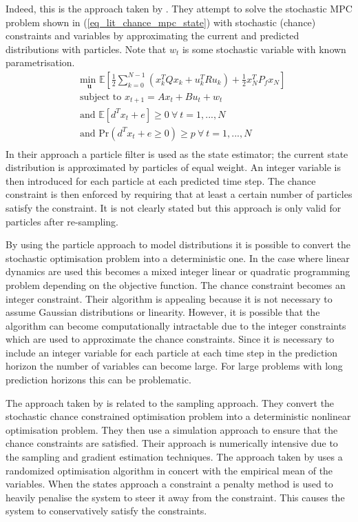Indeed, this is the approach taken by \cite{blackmore}. They attempt to solve the stochastic MPC problem shown in (\ref{eq_lit_chance_mpc_state}) with stochastic (chance) constraints and variables by approximating the current and predicted distributions with particles. Note that $w_t$ is some stochastic variable with known parametrisation.
\begin{equation}
\begin{aligned}
&\underset{\mathbf{u}}{\text{min }} \mathbb{E}\left[ \frac{1}{2}\sum_{k=0}^{N-1} \left( x_k^TQx_k + u_k^TRu_k \right) + \frac{1}{2}x_N^TP_fx_N \right] \\
& \text{subject to } x_{t+1}=Ax_t+Bu_t + w_t \\
& \text{and } \mathbb{E}[d^Tx_t + e] \geq 0 ~\forall ~t=1,...,N \\
& \text{and } \text{Pr}(d^Tx_t + e \geq 0) \geq p ~\forall ~t=1,...,N\\
\end{aligned}
\label{eq_lit_chance_mpc_state}
\end{equation}
In their approach a particle filter is used as the state estimator; the current state distribution is approximated by particles of equal weight. An integer variable is then introduced for each particle at each predicted time step. The chance constraint is then enforced by requiring that at least a certain number of particles satisfy the constraint. It is not clearly stated but this approach is only valid for particles after re-sampling. 

By using the particle approach to model distributions it is possible to convert the stochastic optimisation problem into a deterministic one. In the case where linear dynamics are used this becomes a mixed integer linear or quadratic programming problem depending on the objective function. The chance constraint becomes an integer constraint. Their algorithm is appealing because it is not necessary to assume Gaussian distributions or linearity. However, it is possible that the algorithm can become computationally intractable due to the integer constraints which are used to approximate the chance constraints. Since it is necessary to include an integer variable for each particle at each time step in the prediction horizon the number of variables can become large. For large problems with long prediction horizons this can be problematic.  

The approach taken by \cite{li} is related to the sampling approach. They convert the stochastic chance constrained optimisation problem into a deterministic nonlinear optimisation problem. They then use a simulation approach to ensure that the chance constraints are satisfied. Their approach is numerically intensive due to the sampling and gradient estimation techniques. The approach taken by \cite{batina} uses a randomized optimisation algorithm in concert with the empirical mean of the variables. When the states approach a constraint a penalty method is used to heavily penalise the system to steer it away from the constraint. This causes the system to conservatively satisfy the constraints.

